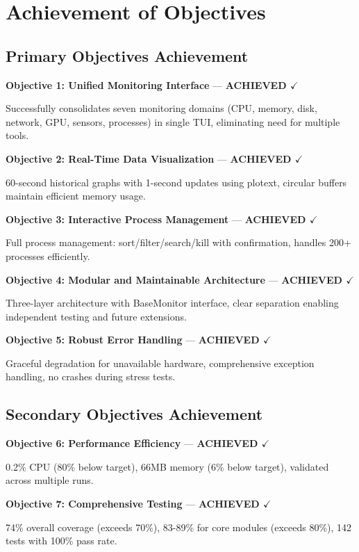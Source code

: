 \documentclass[12pt,a4paper,oneside]{report}
\begin{document}
\section{Achievement of Objectives}
\label{sec:objectives-achievement}

\subsection{Primary Objectives Achievement}

\textbf{Objective 1: Unified Monitoring Interface} --- \textbf{ACHIEVED $\checkmark$}

Successfully consolidates seven monitoring domains (CPU, memory, disk, network, GPU, sensors, processes) in single TUI, eliminating need for multiple tools.

\textbf{Objective 2: Real-Time Data Visualization} --- \textbf{ACHIEVED $\checkmark$}

60-second historical graphs with 1-second updates using plotext, circular buffers maintain efficient memory usage.

\textbf{Objective 3: Interactive Process Management} --- \textbf{ACHIEVED $\checkmark$}

Full process management: sort/filter/search/kill with confirmation, handles 200+ processes efficiently.

\textbf{Objective 4: Modular and Maintainable Architecture} --- \textbf{ACHIEVED $\checkmark$}

Three-layer architecture with BaseMonitor interface, clear separation enabling independent testing and future extensions.

\textbf{Objective 5: Robust Error Handling} --- \textbf{ACHIEVED $\checkmark$}

Graceful degradation for unavailable hardware, comprehensive exception handling, no crashes during stress tests.

\subsection{Secondary Objectives Achievement}

\textbf{Objective 6: Performance Efficiency} --- \textbf{ACHIEVED $\checkmark$}

0.2\% CPU (80\% below target), 66MB memory (6\% below target), validated across multiple runs.

\textbf{Objective 7: Comprehensive Testing} --- \textbf{ACHIEVED $\checkmark$}

74\% overall coverage (exceeds 70\%), 83-89\% for core modules (exceeds 80\%), 142 tests with 100\% pass rate.
\end{document}
